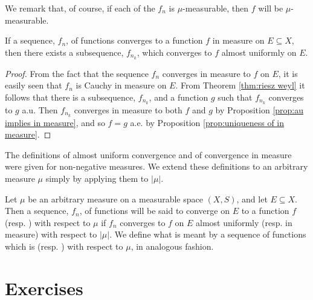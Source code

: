 We remark that, of course, if each of the $f_n$ is $\mu$-measurable, then $f$ will be $\mu$-measurable.

\begin{corollary}\label{cor:in measure implies subsequence ae}
If a sequence, $f_n$, of functions converges to a function $f$ in measure on $E\subseteq X$, then there exists a subsequence, $f_{n_k}$, which converges to $f$ almost uniformly on $E$.
\end{corollary}

\begin{proof}
From the fact that the sequence $f_n$ converges in measure to $f$ on $E$, it is easily seen that $f_n$ is Cauchy in measure on $E$. From Theorem \ref{thm:riesz weyl} it follows that there is a subsequence, $f_{n_k}$, and a function $g$ such that $f_{n_k}$ converges to $g$ a.u. Then $f_{n_k}$ converges in measure to both $f$ and $g$ by Proposition \ref{prop:au implies in measure}, and so $f=g$ a.e. by Proposition \ref{prop:uniqueness of in measure}.
\end{proof}

The definitions of almost uniform convergence and of convergence in measure were given for non-negative measures. We extend these definitions to an arbitrary measure $\mu$ simply by applying them to $|\mu|$.

\begin{definition}
Let $\mu$ be an arbitrary measure on a measurable space $(X, S)$, and let $E\subseteq X$. Then a sequence, $f_n$, of functions will be said to converge on $E$ to a function $f$  (resp. ) with respect to $\mu$ if $f_n$ converges to $f$ on $E$ almost uniformly (resp. in measure) with respect to $|\mu|$. We define what is meant by a sequence of functions which is  (resp. ) with respect to $\mu$, in analogous fashion. 
\end{definition}

\section{Exercises}

